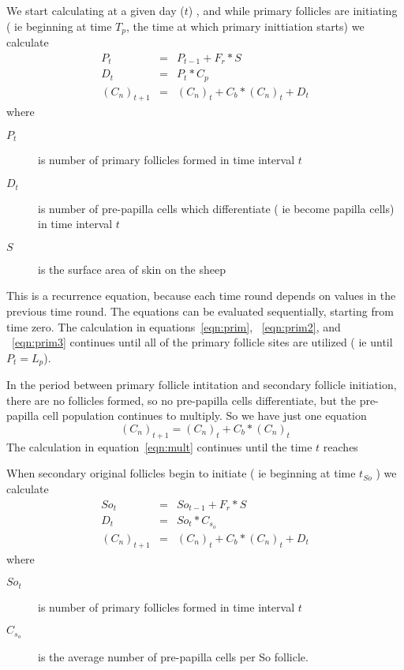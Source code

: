 \documentclass[titlepage]{article}  %
\begin{document}
We start calculating at a given day ($t$) , and while primary follicles are initiating ( ie beginning at time $T_{p}$, the time at which primary inittiation starts) we calculate
\begin{eqnarray}
\label{eqn:prim}
P_{t} & = & P_{t-1} +  F_{r} * S \\
\label{eqn:prim2}
D_{t} & = & P_{t} * C_{p} \\
\label{eqn:prim3}
(C_{n})_{t+1} & = & (C_{n})_{t} + C_{b} * (C_{n})_{t} + D_{t}
\end{eqnarray}
where 
\begin{description}
\item[$P_{t}$] is number of primary follicles formed in time interval $t$
\item[$D_{t}$] is number of pre-papilla cells which differentiate ( ie become papilla cells) in time interval $t$
\item[$S$] is the surface area of skin on the sheep
\end{description}
This is a recurrence equation, because each time round depends on values in the previous time round. The equations can be evaluated sequentially, starting from time zero. The calculation in equations~\ref{eqn:prim}, ~\ref{eqn:prim2}, and ~\ref{eqn:prim3} continues until all of the primary follicle sites are utilized ( ie until $ P_{t} = L_{p} $). 

In the period between primary follicle intitation and secondary follicle initiation, there are no follicles formed, so no pre-papilla cells differentiate, but the pre-papilla cell population continues to multiply. So we have just one equation
\begin{equation}
\label{eqn:mult}
(C_{n})_{t+1}  =  (C_{n})_{t} + C_{b} * (C_{n})_{t}
\end{equation}
The calculation in equation~\ref{eqn:mult} continues until the time $t$ reaches 

When secondary original follicles begin to initiate ( ie beginning at time $t_{So}$ ) we calculate
\begin{eqnarray}
\label{eqn:so}
So_{t} & = & So_{t-1} +  F_{r} * S \\
\label{eqn:so2}
D_{t} & = & So_{t} * C_{s_{o}} \\
\label{eqn:so3}
(C_{n})_{t+1} & = & (C_{n})_{t} + C_{b} * (C_{n})_{t} + D_{t}
\end{eqnarray}
where
\begin{description}
\item[$So_{t}$] is number of primary follicles formed in time interval $t$
\item[$C_{s_{o}}$] is the average number of pre-papilla cells per So follicle.
\end{description}
\end{document}
